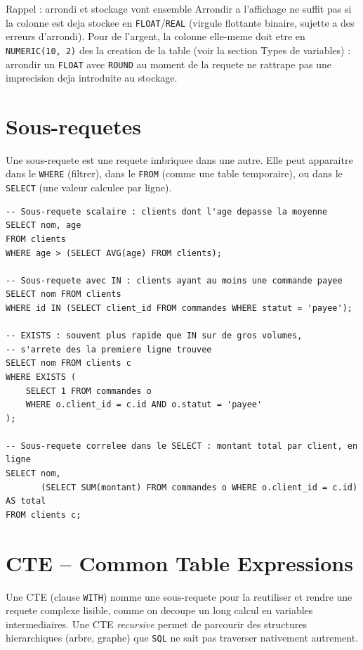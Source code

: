 \documentclass[11pt,a4paper]{article}
\begin{document}
\begin{infobox}{Rappel : arrondi et stockage vont ensemble}
Arrondir a l'affichage ne suffit pas si la colonne est deja stockee en
\texttt{FLOAT}/\texttt{REAL} (virgule flottante binaire, sujette a des
erreurs d'arrondi). Pour de l'argent, la colonne elle-meme doit etre en
\texttt{NUMERIC(10, 2)} des la creation de la table (voir la section Types de
variables) : arrondir un \texttt{FLOAT} avec \texttt{ROUND} au moment de la
requete ne rattrape pas une imprecision deja introduite au stockage.
\end{infobox}

\section{Sous-requetes}
Une sous-requete est une requete imbriquee dans une autre. Elle peut apparaitre
dans le \texttt{WHERE} (filtrer), dans le \texttt{FROM} (comme une table
temporaire), ou dans le \texttt{SELECT} (une valeur calculee par ligne).

\begin{lstlisting}
-- Sous-requete scalaire : clients dont l'age depasse la moyenne
SELECT nom, age
FROM clients
WHERE age > (SELECT AVG(age) FROM clients);

-- Sous-requete avec IN : clients ayant au moins une commande payee
SELECT nom FROM clients
WHERE id IN (SELECT client_id FROM commandes WHERE statut = 'payee');

-- EXISTS : souvent plus rapide que IN sur de gros volumes,
-- s'arrete des la premiere ligne trouvee
SELECT nom FROM clients c
WHERE EXISTS (
    SELECT 1 FROM commandes o
    WHERE o.client_id = c.id AND o.statut = 'payee'
);

-- Sous-requete correlee dans le SELECT : montant total par client, en ligne
SELECT nom,
       (SELECT SUM(montant) FROM commandes o WHERE o.client_id = c.id) AS total
FROM clients c;
\end{lstlisting}

\section{CTE -- Common Table Expressions}
Une CTE (clause \texttt{WITH}) nomme une sous-requete pour la reutiliser et
rendre une requete complexe lisible, comme on decoupe un long calcul en
variables intermediaires. Une CTE \emph{recursive} permet de parcourir des
structures hierarchiques (arbre, graphe) que \texttt{SQL} ne sait pas
traverser nativement autrement.
\end{document}
